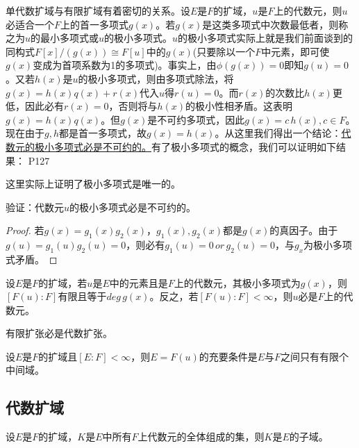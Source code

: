 \original
{
	单代数扩域与有限扩域有着密切的关系。设$E$是$F$的扩域，$u$是$F$上的代数元，则$u$必适合一个$F$上的首一多项式$g(x)$。若$g(x)$是这类多项式中次数最低者，则称之为$u$的最小多项式或$u$的极小多项式。$u$的极小多项式实际上就是我们前面谈到的同构式$F[x]/(g(x))\cong F[u]$中的$g(x)$(只要除以一个$F$中元素，即可使$g(x)$变成为首项系数为1的多项式)。事实上，由$\phi(g(x))=0$即知$g(u)=0$。又若$h(x)$是$u$的极小多项式，则由多项式除法，将$g(x)=h(x)q(x)+r(x)$代入$u$得$r(u)=0$。而$r(x)$的次数比$h(x)$更低，因此必有$r(x)=0$，否则将与$h(x)$的极小性相矛盾。这表明$g(x)=h(x)q(x)$。但$g(x)$是不可约多项式，因此$g(x)=c\,h(x),c\in F$。现在由于$g,h$都是首一多项式，故$g(x)=h(x)$。从这里我们得出一个结论：\uline{代数元的极小多项式必是不可约的。}有了极小多项式的概念，我们可以证明如下结果：
}
{P127}
\begin{remark}
	这里实际上证明了极小多项式是唯一的。
\end{remark}
\begin{proposition}
	验证：代数元$u$的极小多项式必是不可约的。
\end{proposition}

\begin{proof}
	若$g(x)=g_{1}(x)g_{2}(x)$，$g_{1}(x),g_{2}(x)$都是$g(x)$的真因子。由于$g(u)=g_{1}(u)g_{2}(u)=0$，则必有$g_{1}(u)=0\, or\, g_{2}(u)=0$，与$g_{x}$为极小多项式矛盾。
\end{proof}


\begin{theorem}
	设$E$是$F$的扩域，若$u$是$E$中的元素且是$F$上的代数元，其极小多项式为$g(x)$，则$[F(u):F]$有限且等于$deg \, g(x)$。反之，若$[F(u):F]<\infty$，则$u$必是$F$上的代数元。
\end{theorem}

\begin{corollary}
	有限扩张必是代数扩张。
\end{corollary}

\begin{theorem}[Steinitz定理]
	设$E$是$F$的扩域且$[E:F]<\infty$，则$E=F(u)$的充要条件是$E$与$F$之间只有有限个中间域。
\end{theorem}


\subsection{代数扩域}

\begin{theorem}\label{YMSthe040201}
	设$E$是$F$的扩域，$K$是$E$中所有$F$上代数元的全体组成的集，则$K$是$E$的子域。
\end{theorem}

